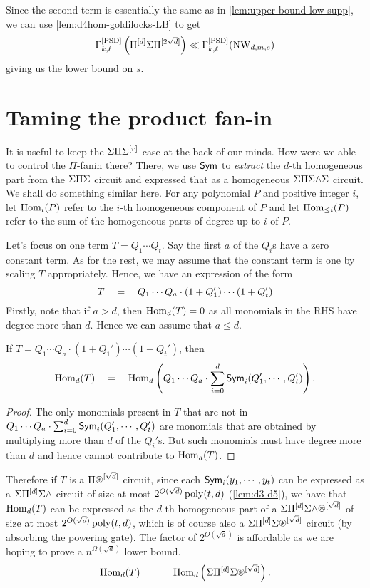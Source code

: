 Since the second term is essentially the same as in \autoref{lem:upper-bound-low-supp}, we can use \autoref{lem:d4hom-goldilocks-LB} to get
\[
\Gamma^{\mathrm{[PSD]}}_{k,\ell}\left(\Pi^{[d]}\Sigma\Pi^{[2\sqrt{d}]}\right) \ll \Gamma^{\mathrm{[PSD]}}_{k,\ell}(\operatorname{\mathrm{NW}}_{d,m,e})
\]
giving us the lower bound on $s$. 

\section{Taming the product fan-in}

It is useful to keep the $\Sigma\Pi\Sigma^{[r]}$ case at the back of our minds.
How were we able to control the $\Pi$-fanin there?
There, we use $\operatorname{\mathsf{Sym}}$ to \emph{extract} the $d$-th homogeneous part from the $\Sigma\Pi\Sigma$ circuit and expressed that as a homogeneous $\Sigma\Pi\Sigma\mathord{\wedge}\Sigma$ circuit. 
We shall do something similar here.
For any polynomial $P$ and positive integer $i$, let $\operatorname{Hom}_i(P)$ refer to the $i$-th homogeneous component of $P$ and let $\operatorname{Hom}_{\leq i}(P)$ refer to the sum of the  homogeneous parts of degree up to $i$ of $P$. 

Let's focus on one term $T = Q_1 \cdots Q_t$. Say the first $a$ of the $Q_i$s have a zero constant term. As for the rest, we may assume that the constant term is one by scaling $T$ appropriately. Hence, we have an expression of the form 
\[
T \quad = \quad Q_1 \cdots Q_a \cdot (1 + Q_{1}') \cdots (1 + Q_t')
\]
Firstly, note that if $a > d$, then $\operatorname{Hom}_d(T) = 0$ as all monomials in the RHS have degree more than $d$. Hence we can assume that $a\leq d$. 

\begin{claim}
If $T = Q_1 \cdots Q_a \cdot (1 + Q_{1}') \cdots (1 + Q_t')$, then 
\[
\operatorname{Hom}_d(T) \quad = \quad \operatorname{Hom}_d\left(Q_1 \cdots Q_a \cdot \sum_{i=0}^d \operatorname{\mathsf{Sym}}_i(Q_{1}', \cdots,  Q_t')\right).
\]
\end{claim}
\begin{proof}
The only monomials present in $T$ that are not in $Q_1 \cdots Q_a \cdot \sum_{i=0}^d \operatorname{\mathsf{Sym}}_i(Q_{1}', \cdots,  Q_t')$ are monomials that are obtained by multiplying more than $d$ of the $Q_i'$s. But such monomials must have degree more than $d$ and hence cannot contribute to $\operatorname{Hom}_d(T)$. 
\end{proof}

Therefore if $T$ is a $\Pi\circast^{[\sqrt{d}]}$ circuit, since each $\operatorname{\mathsf{Sym}}_i(y_1,\cdots, y_t)$ can be expressed as a $\Sigma\Pi^{[d]}\Sigma\mathord{\wedge}$ circuit of size at most $2^{O(\sqrt{d})} \operatorname{poly}(t,d)$ (\autoref{lem:d3-d5}), we have that $\operatorname{Hom}_d(T)$ can be expressed as the $d$-th homogeneous part of a  $\Sigma\Pi^{[d]}\Sigma\mywedge\circast^{[\sqrt{d}]}$ of size at most $2^{O(\sqrt{d})} \operatorname{poly}(t,d)$, which is of course also a $\Sigma\Pi^{[d]}\Sigma\circast^{[\sqrt{d}]}$ circuit (by absorbing the powering gate). The factor of $2^{O(\sqrt{d})}$ is affordable as we are hoping to prove a $n^{\Omega(\sqrt{d})}$ lower bound. 
\[
\Hom_d(T) \spaced{=} \Hom_d\inparen{\Sigma\Pi^{[d]}\Sigma\circast^{[\sqrt{d}]}}.
\]

